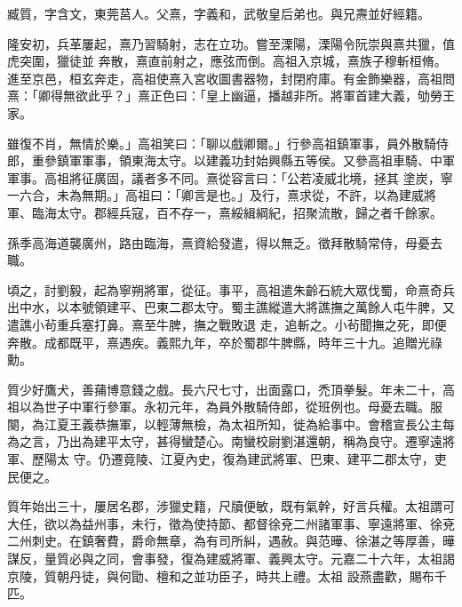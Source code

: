 
\begin{pinyinscope}

 臧質，字含文，東莞莒人。父熹，字義和，武敬皇后弟也。與兄燾並好經籍。



 隆安初，兵革屢起，熹乃習騎射，志在立功。嘗至溧陽，溧陽令阮崇與熹共獵，值虎突圍，獵徒並
 奔散，熹直前射之，應弦而倒。高祖入京城，熹族子穆斬桓脩。進至京邑，桓玄奔走，高祖使熹入宮收圖書器物，封閉府庫。有金飾樂器，高祖問熹：「卿得無欲此乎？」熹正色曰：「皇上幽逼，播越非所。將軍首建大義，劬勞王家。



 雖復不肖，無情於樂。」高祖笑曰：「聊以戲卿爾。」行參高祖鎮軍事，員外散騎侍郎，重參鎮軍軍事，領東海太守。以建義功封始興縣五等侯。又參高祖車騎、中軍軍事。高祖將征廣固，議者多不同。熹從容言曰：「公若凌威北境，拯其
 塗炭，寧一六合，未為無期。」高祖曰：「卿言是也。」及行，熹求從，不許，以為建威將軍、臨海太守。郡經兵寇，百不存一，熹綏緝綱紀，招聚流散，歸之者千餘家。



 孫季高海道襲廣州，路由臨海，熹資給發遣，得以無乏。徵拜散騎常侍，母憂去職。



 頃之，討劉毅，起為寧朔將軍，從征。事平，高祖遣朱齡石統大眾伐蜀，命熹奇兵出中水，以本號領建平、巴東二郡太守。蜀主譙縱遣大將譙撫之萬餘人屯牛脾，又遣譙小茍重兵塞打鼻。熹至牛脾，撫之戰敗退
 走，追斬之。小茍聞撫之死，即便奔散。成都既平，熹遇疾。義熙九年，卒於蜀郡牛脾縣，時年三十九。追贈光祿勳。



 質少好鷹犬，善蒱博意錢之戲。長六尺七寸，出面露口，禿頂拳髮。年未二十，高祖以為世子中軍行參軍。永初元年，為員外散騎侍郎，從班例也。母憂去職。服闋，為江夏王義恭撫軍，以輕薄無檢，為太祖所知，徙為給事中。會稽宣長公主每為之言，乃出為建平太守，甚得蠻楚心。南蠻校尉劉湛還朝，稱為良守。遷寧遠將軍、歷陽太
 守。仍遷竟陵、江夏內史，復為建武將軍、巴東、建平二郡太守，吏民便之。



 質年始出三十，屢居名郡，涉獵史籍，尺牘便敏，既有氣幹，好言兵權。太祖謂可大任，欲以為益州事，未行，徵為使持節、都督徐兗二州諸軍事、寧遠將軍、徐兗二州刺史。在鎮奢費，爵命無章，為有司所糾，遇赦。與范曄、徐湛之等厚善，曄謀反，量質必與之同，會事發，復為建威將軍、義興太守。元嘉二十六年，太祖謁京陵，質朝丹徒，與何勖、檀和之並功臣子，時共上禮。太祖
 設燕盡歡，賜布千匹。




\end{pinyinscope}
